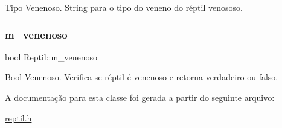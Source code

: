 Tipo Venenoso. String para o tipo do veneno do réptil venososo. \mbox{\label{classReptil_ac195c1dc9a0fa38bc0551034c609c434}} 
\subsubsection{\texorpdfstring{m\+\_\+venenoso}{m\_venenoso}}
{\footnotesize\ttfamily bool Reptil\+::m\+\_\+venenoso\hspace{0.3cm}{\ttfamily [protected]}}

Bool Venenoso. Verifica se réptil é venenoso e retorna verdadeiro ou falso. 

A documentação para esta classe foi gerada a partir do seguinte arquivo\+:\begin{DoxyCompactItemize}
\item 
\hyperlink{reptil_8h}{reptil.\+h}\end{DoxyCompactItemize}
